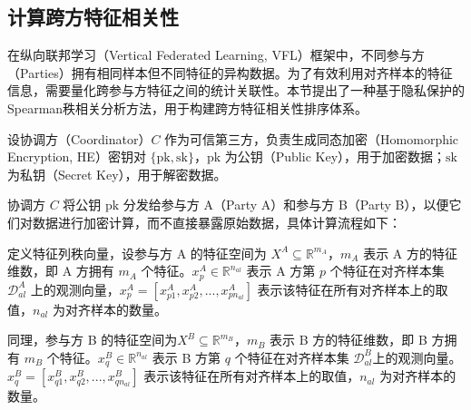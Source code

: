 \subsection{计算跨方特征相关性}
在纵向联邦学习（Vertical Federated Learning, VFL）框架中，不同参与方（Parties）拥有相同样本但不同特征的异构数据。为了有效利用对齐样本的特征信息，需要量化跨参与方特征之间的统计关联性。本节提出了一种基于隐私保护的Spearman秩相关分析方法，用于构建跨方特征相关性排序体系。

设协调方（Coordinator）$ C $ 作为可信第三方，负责生成同态加密（Homomorphic Encryption, HE）密钥对 $ \{\text{pk}, \text{sk}\} $，$ \text{pk} $ 为公钥（Public Key），用于加密数据；$ \text{sk} $ 为私钥（Secret Key），用于解密数据。

协调方 $ C $ 将公钥 $ \text{pk} $ 分发给参与方 A（Party A）和参与方 B（Party B），以便它们对数据进行加密计算，而不直接暴露原始数据，具体计算流程如下：

定义特征列秩向量，设参与方 A 的特征空间为 $X^A \subseteq \mathbb{R}^{m_A}$，$ m_A $ 表示 A 方的特征维数，即 A 方拥有 $ m_A $ 个特征。$ x^A_p \in \mathbb{R}^{n_{al}} $ 表示 A 方第 $ p $ 个特征在对齐样本集 $ \mathcal{D}^A_{al} $ 上的观测向量，$ x^A_p = [x^A_{p1}, x^A_{p2}, ..., x^A_{pn_{al}}] $ 表示该特征在所有对齐样本上的取值，$ n_{al} $ 为对齐样本的数量。

同理，参与方 B 的特征空间为$X^B \subseteq \mathbb{R}^{m_B}$，$ m_B $ 表示 B 方的特征维数，即 B 方拥有 $ m_B $ 个特征。$ x^B_q \in \mathbb{R}^{n_{al}} $ 表示 B 方第 $ q $ 个特征在对齐样本集 $ \mathcal{D}^B_{al} $上的观测向量。$ x^B_q = [x^B_{q1}, x^B_{q2}, ..., x^B_{qn_{al}}] $ 表示该特征在所有对齐样本上的取值，$ n_{al} $ 为对齐样本的数量。

